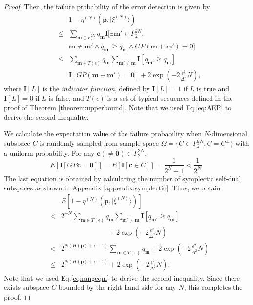 \documentclass[aps,prx,twocolumn,showpacs,amsmath,notitlepage,amssymb,superscriptaddress]{revtex4-1}
\newcommand{\ket}[1]{| {#1} \rangle}
\begin{document}
\begin{proof}
Then, the failure probability of the error detection is given by
\begin{eqnarray}
 &&1-\eta^{(N)}(\mathbf{p},\ket{\xi^{(N)}})\\
 &\leq&\sum_{\mathbf{m}\in F_2^{2N}}q_{\mathbf{m}}\mathbf{I}\Big[\exists \mathbf{m}'\in F_2^{2N},\nonumber\\
 &&\mathbf{m}\neq\mathbf{m}'\wedge q_{\mathbf{m}'}\geq q_{\mathbf{m}}\wedge GP(\mathbf{m}+\mathbf{m}')=\mathbf{0}\Big]\\
 &\leq&\sum_{\mathbf{m}\in T(\epsilon)}q_{\mathbf{m}}\sum_{\mathbf{m}'\neq\mathbf{m}}\mathbf{I}\left[q_{\mathbf{m}'}\geq q_{\mathbf{m}}\right]\nonumber\\
 &&\mathbf{I}\left[ GP(\mathbf{m}+\mathbf{m}')=\mathbf{0}\right]+2\exp\left(-2\frac{\epsilon^2}{\Delta^2}N\right),
\end{eqnarray}
where $\mathbf{I}[L]$ is the {\it indicator function}, defined by $\mathbf{I}[L]=1$ if $L$ is true and $\mathbf{I}[L]=0$ if $L$ is false, and $T(\epsilon)$ is a set of typical sequences defined in the proof of Theorem \ref{theorem:upperbound}. Note that we used Eq.\eqref{eq:AEP} to derive the second inequality.


We calculate the expectation value of the failure probability when $N$-dimensional subspace $C$ is randomly sampled from sample space $\Omega=\{C\subset F_2^{2N}:C=C^{\bot}\}$ with a uniform probability. For any $\mathbf{c}(\neq\mathbf{0})\in F_2^{2N}$,
\begin{equation}
\label{eq:symplectic}
 E\left[\mathbf{I}\left[ GP\mathbf{c}=\mathbf{0}\right]\right] 
 =E\left[\mathbf{I}\left[\mathbf{c}\in C\right]\right]
 =\frac{1}{2^{N}+1}<\frac{1}{2^N}.
\end{equation}
The last equation is obtained by calculating the number of symplectic self-dual subspaces as shown in Appendix \ref{appendix:symplectic}. Thus, we obtain
\begin{eqnarray}
&& E\left[1-\eta^{(N)}(\mathbf{p},\ket{\xi^{(N)}})\right]\nonumber\\
 &< &2^{-N}\sum_{\mathbf{m}\in T(\epsilon)}q_{\mathbf{m}}\sum_{\mathbf{m}'\neq\mathbf{m}}\mathbf{I}\left[q_{\mathbf{m}'}\geq q_{\mathbf{m}}\right]\nonumber\\&&\ \ \ \ \ \ \ \ \ \ \ \ \ \ \ \ \ \ \ \ \ \ \ \ \ \ \ \ \ \ \ + 2\exp\left(-2\frac{\epsilon^2}{\Delta^2}N\right)\\
 &<& 2^{N(H(\mathbf{p})+\epsilon-1)}\sum_{\mathbf{m}\in T(\epsilon)}q_{\mathbf{m}}+ 2\exp\left(-2\frac{\epsilon^2}{\Delta^2}N\right)\\
 &\leq& 2^{N\left(H(\mathbf{p})+\epsilon-1\right)}+2\exp\left(-2\frac{\epsilon^2}{\Delta^2}N\right).
\end{eqnarray}
Note that we used Eq.\eqref{eq:rangeqm} to derive the second inequality.
Since there exists subspace $C$ bounded by the right-hand side for any $N$, this completes the proof.
\end{proof}
\end{document}
